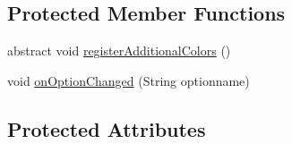 \subsection*{Protected Member Functions}
\begin{DoxyCompactItemize}
\item 
abstract void \hyperlink{classorg_1_1tzi_1_1use_1_1gui_1_1views_1_1diagrams_1_1_diagram_options_adc54ac5afbb7cef37dc5ff0d728274e2}{register\-Additional\-Colors} ()
\item 
void \hyperlink{classorg_1_1tzi_1_1use_1_1gui_1_1views_1_1diagrams_1_1_diagram_options_a4e038d1a445ab4d5201b3d59431df98d}{on\-Option\-Changed} (String optionname)
\end{DoxyCompactItemize}
\subsection*{Protected Attributes}
